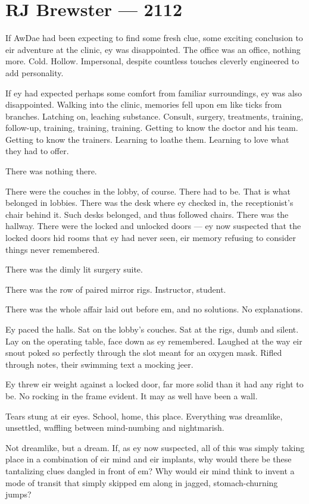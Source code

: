 \hypertarget{rj-brewster-2112}{%
\chapter*{RJ Brewster — 2112}\label{rj-brewster-2112}}

If AwDae had been expecting to find some fresh clue, some exciting conclusion to eir adventure at the clinic, ey was disappointed. The office was an office, nothing more. Cold. Hollow. Impersonal, despite countless touches cleverly engineered to add personality.

If ey had expected perhaps some comfort from familiar surroundings, ey was also disappointed. Walking into the clinic, memories fell upon em like ticks from branches. Latching on, leaching substance. Consult, surgery, treatments, training, follow-up, training, training, training. Getting to know the doctor and his team. Getting to know the trainers. Learning to loathe them. Learning to love what they had to offer.

There was nothing there.

There were the couches in the lobby, of course. There had to be. That is what belonged in lobbies. There was the desk where ey checked in, the receptionist's chair behind it. Such desks belonged, and thus followed chairs. There was the hallway. There were the locked and unlocked doors — ey now suspected that the locked doors hid rooms that ey had never seen, eir memory refusing to consider things never remembered.

There was the dimly lit surgery suite.

There was the row of paired mirror rigs. Instructor, student.

There was the whole affair laid out before em, and no solutions. No explanations.

Ey paced the halls. Sat on the lobby's couches. Sat at the rigs, dumb and silent. Lay on the operating table, face down as ey remembered. Laughed at the way eir snout poked so perfectly through the slot meant for an oxygen mask. Rifled through notes, their swimming text a mocking jeer.

Ey threw eir weight against a locked door, far more solid than it had any right to be. No rocking in the frame evident. It may as well have been a wall.

Tears stung at eir eyes. School, home, this place. Everything was dreamlike, unsettled, waffling between mind-numbing and nightmarish.

Not dreamlike, but a dream. If, as ey now suspected, all of this was simply taking place in a combination of eir mind and eir implants, why would there be these tantalizing clues dangled in front of em? Why would eir mind think to invent a mode of transit that simply skipped em along in jagged, stomach-churning jumps?

